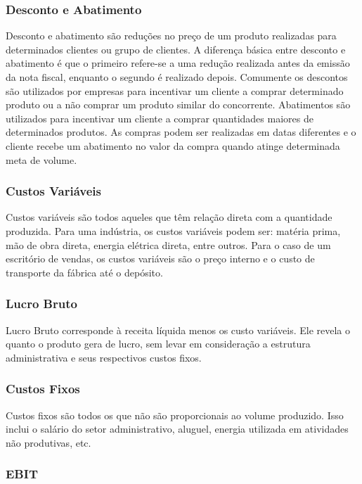 \documentclass[12pt]{article}
\begin{document}
\subsubsection{Desconto e Abatimento}

	Desconto e abatimento são reduções no preço de um produto realizadas para determinados clientes ou grupo de clientes. A diferença básica entre desconto e abatimento é que o primeiro refere-se a uma redução realizada antes da emissão da nota fiscal, enquanto o segundo é realizado depois. Comumente os descontos são utilizados por empresas para incentivar um cliente a comprar determinado produto ou a não comprar um produto similar do concorrente. Abatimentos são utilizados para incentivar um cliente a comprar quantidades maiores de determinados produtos. As compras podem ser realizadas em datas diferentes e o cliente recebe um abatimento no valor da compra quando atinge determinada meta de volume.

\subsubsection{Custos Variáveis}

	Custos variáveis são todos aqueles que têm relação direta com a quantidade produzida. Para uma indústria, os custos variáveis podem ser: matéria prima, mão de obra direta, energia elétrica direta, entre outros. Para o caso de um escritório de vendas, os custos variáveis são o preço interno e o custo de transporte da fábrica até o depósito.

\subsubsection{Lucro Bruto}

	Lucro Bruto corresponde à receita líquida menos os custo variáveis. Ele revela o quanto o produto gera de lucro, sem levar em consideração a estrutura administrativa e seus respectivos custos fixos.

\subsubsection{Custos Fixos}

	Custos fixos são todos os que não são proporcionais ao volume produzido. Isso inclui o salário do setor administrativo, aluguel, energia utilizada em atividades não produtivas, etc.

\subsubsection{EBIT}
\end{document}
